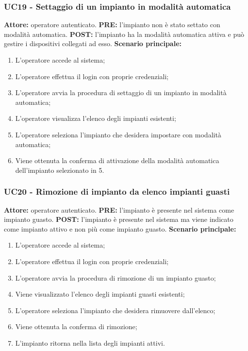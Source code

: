 \documentclass[a4paper, 12pt]{article}
\begin{document}
\subsubsection{UC19 - Settaggio di un impianto in modalità automatica}
\textbf{Attore:} operatore autenticato.\newline
\textbf{PRE:} l'impianto non è stato settato con modalità automatica.\newline
\textbf{POST:} l'impianto ha la modalità automatica attiva e può gestire i dispositivi collegati ad esso.\newline
\textbf{Scenario principale:}
\begin{enumerate}
    \item L'operatore accede al sistema;
    \item L'operatore effettua il login con proprie credenziali;
    \item L'operatore avvia la procedura di settaggio di un impianto in modalità automatica;
    \item L'operatore visualizza l'elenco degli impianti esistenti;
    \item L'operatore seleziona l'impianto che desidera impostare con modalità automatica;
    \item Viene ottenuta la conferma di attivazione della modalità automatica dell'impianto selezionato in 5.
\end{enumerate}

\subsubsection{UC20 - Rimozione di impianto da elenco impianti guasti}
\textbf{Attore:} operatore autenticato.\newline
\textbf{PRE:} l'impianto è presente nel sistema come impianto guasto.\newline
\textbf{POST:} l'impianto è presente nel sistema ma viene indicato come impianto
attivo e non più come impianto guasto.\newline
\textbf{Scenario principale:}
\begin{enumerate}
    \item L'operatore accede al sistema;
    \item L'operatore effettua il login con proprie credenziali;
    \item L'operatore avvia la procedura di rimozione di un impianto guasto;
    \item Viene visualizzato l'elenco degli impianti guasti esistenti;
    \item L'operatore seleziona l'impianto che desidera rimuovere dall'elenco;
    \item Viene ottenuta la conferma di rimozione;
    \item L'impianto ritorna nella lista degli impianti attivi.
\end{enumerate}
\end{document}
